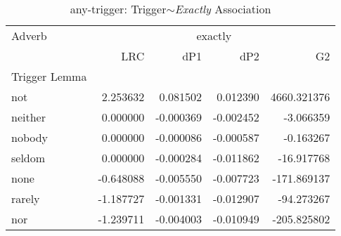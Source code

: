 
\begin{table}[ht]
\caption{any-trigger: Trigger$\sim$\textit{Exactly} Association}
\label{trigger-exactly-AM}
\begin{tabular}{lrrrr}
\toprule
Adverb & \multicolumn{4}{|c|}{exactly} \\
 & LRC & dP1 & dP2 & G2 \\
Trigger Lemma &  &  &  &  \\
\midrule
not & {\cellcolor[HTML]{67001F}} \color[HTML]{F1F1F1} 2.253632 & {\cellcolor[HTML]{67001F}} \color[HTML]{F1F1F1} 0.081502 & {\cellcolor[HTML]{67001F}} \color[HTML]{F1F1F1} 0.012390 & {\cellcolor[HTML]{67001F}} \color[HTML]{F1F1F1} 4660.321376 \\
neither & {\cellcolor[HTML]{FCD5BF}} \color[HTML]{000000} 0.000000 & {\cellcolor[HTML]{78B4D5}} \color[HTML]{000000} -0.000369 & {\cellcolor[HTML]{DBEAF2}} \color[HTML]{000000} -0.002452 & {\cellcolor[HTML]{A5CEE3}} \color[HTML]{000000} -3.066359 \\
nobody & {\cellcolor[HTML]{FCD5BF}} \color[HTML]{000000} 0.000000 & {\cellcolor[HTML]{7BB6D6}} \color[HTML]{000000} -0.000086 & {\cellcolor[HTML]{F6F7F7}} \color[HTML]{000000} -0.000587 & {\cellcolor[HTML]{A5CEE3}} \color[HTML]{000000} -0.163267 \\
seldom & {\cellcolor[HTML]{FCD5BF}} \color[HTML]{000000} 0.000000 & {\cellcolor[HTML]{78B4D5}} \color[HTML]{000000} -0.000284 & {\cellcolor[HTML]{175290}} \color[HTML]{F1F1F1} -0.011862 & {\cellcolor[HTML]{A2CDE3}} \color[HTML]{000000} -16.917768 \\
none & {\cellcolor[HTML]{F7F6F6}} \color[HTML]{000000} -0.648088 & {\cellcolor[HTML]{529DC8}} \color[HTML]{F1F1F1} -0.005550 & {\cellcolor[HTML]{569FC9}} \color[HTML]{F1F1F1} -0.007723 & {\cellcolor[HTML]{96C7DF}} \color[HTML]{000000} -171.869137 \\
rarely & {\cellcolor[HTML]{D4E6F1}} \color[HTML]{000000} -1.187727 & {\cellcolor[HTML]{71B0D3}} \color[HTML]{F1F1F1} -0.001331 & {\cellcolor[HTML]{0C3D73}} \color[HTML]{F1F1F1} -0.012907 & {\cellcolor[HTML]{9DCBE1}} \color[HTML]{000000} -94.273267 \\
nor & {\cellcolor[HTML]{D1E5F0}} \color[HTML]{000000} -1.239711 & {\cellcolor[HTML]{5FA5CD}} \color[HTML]{F1F1F1} -0.004003 & {\cellcolor[HTML]{2065AB}} \color[HTML]{F1F1F1} -0.010949 & {\cellcolor[HTML]{90C4DD}} \color[HTML]{000000} -205.825802 \\

\end{tabular}
\end{table}
